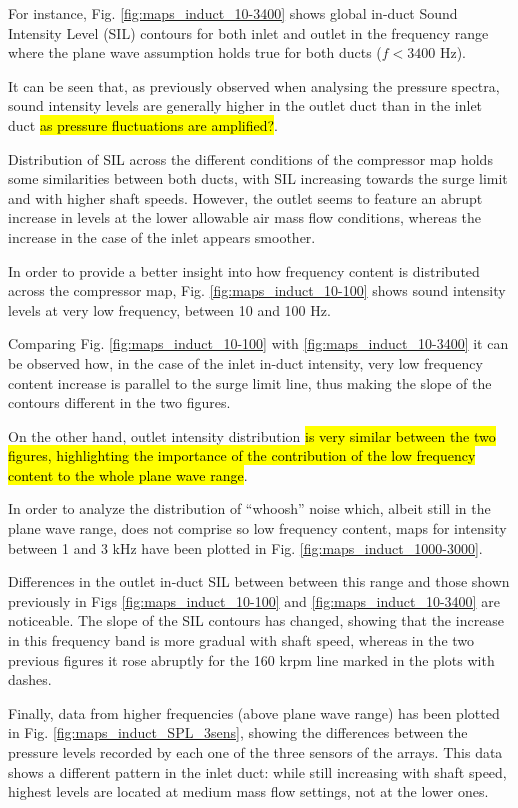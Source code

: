 For instance, Fig. \ref{fig:maps_induct_10-3400} shows global in-duct Sound Intensity Level (SIL) contours for both inlet and outlet in the frequency range where the plane wave assumption holds true for both ducts ($f<3400$ Hz). 

It can be seen that, as previously observed when analysing the pressure spectra, sound intensity levels are generally higher in the outlet duct than in the inlet duct \hl{as pressure fluctuations are amplified?}. 

Distribution of SIL across the different conditions of the compressor map holds some similarities between both ducts, with SIL increasing towards the surge limit and with higher shaft speeds. However, the outlet seems to feature an abrupt increase in levels at the lower allowable air mass flow conditions, whereas the increase in the case of the inlet appears smoother. 

In order to provide a better insight into how frequency content is distributed across the compressor map, Fig. \ref{fig:maps_induct_10-100} shows sound intensity levels at very low frequency, between 10 and 100 Hz.

Comparing Fig. \ref{fig:maps_induct_10-100} with \ref{fig:maps_induct_10-3400} it can be observed how, in the case of the inlet in-duct intensity, very low frequency content increase is parallel to the surge limit line, thus making the slope of the contours different in the two figures.

On the other hand, outlet intensity distribution \hl{is very similar between the two figures, highlighting the importance of the contribution of the low frequency content to the whole plane wave range}.

In order to analyze the distribution of ``whoosh'' noise which, albeit still in the plane wave range, does not comprise so low frequency content, maps for intensity between 1 and 3 kHz have been plotted in Fig. \ref{fig:maps_induct_1000-3000}.

Differences in the outlet in-duct SIL between between this range and those shown previously in Figs \ref{fig:maps_induct_10-100} and \ref{fig:maps_induct_10-3400} are noticeable. The slope of the SIL contours has changed, showing that the increase in this frequency band is more gradual with shaft speed, whereas in the two previous figures it rose abruptly for the 160 krpm line marked in the plots with dashes.

Finally, data from higher frequencies (above plane wave range) has been plotted in Fig. \ref{fig:maps_induct_SPL_3sens}, showing the differences between the pressure levels recorded by each one of the three sensors of the arrays. This data shows a different pattern in the inlet duct: while still increasing with shaft speed, highest levels are located at medium mass flow settings, not at the lower ones.

